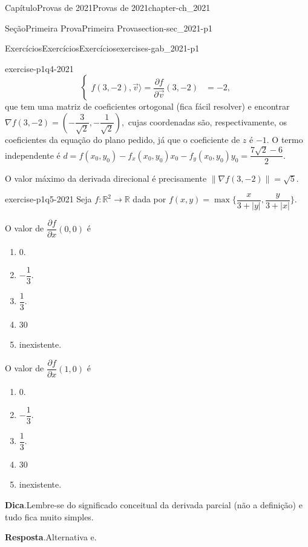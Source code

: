 \documentclass[oneside,10pt,]{book}
\newcommand{\blocktitlefont}{\relax}
\numberwithin{equation}{section}
\newcommand{\R}{\mathbb R}
\begin{document}
\begin{chapterptx}{Capítulo}{Provas de 2021}{}{Provas de 2021}{}{}{chapter-ch_2021}
\begin{sectionptx}{Seção}{Primeira Prova}{}{Primeira Prova}{}{}{section-sec_2021-p1}
\begin{exercises-subsection-numberless}{Exercícios}{Exercícios}{}{Exercícios}{}{}{exercises-gab_2021-p1}
\begin{divisionexercise}{4}{}{}{exercise-p1q4-2021}
\begin{equation*}
\begin{cases}
f(3,-2),\vec{v}\big\rangle= \dfrac{\partial f}{\partial
\vec{v}}(3,-2)&=-2, \end{cases}
\end{equation*}
que tem uma matriz de coeficientes ortogonal (fica fácil resolver) e encontrar \(\nabla
f(3,-2)=\left(-\dfrac{3}{\sqrt{2}},-\dfrac{1}{\sqrt{2}}\right),\) cujas coordenadas são, respectivamente, os coeficientes da equação do plano pedido, já que o coeficiente de \(z\) é \(-1\). O termo independente é \(d=f(x_0,y_0)-f_x(x_0,y_0)x_0-f_y(x_0,y_0)y_0=\dfrac{7\sqrt{2}-6}{2}\).%
\par
O valor máximo da derivada direcional é precisamente \(\|\nabla f(3,-2)\|=\sqrt{5}\).%
\end{divisionexercise}%
\begin{divisionexercise}{5}{}{}{exercise-p1q5-2021}%
Seja \(f\colon \R^2\to\R\) dada por \(f(x,y)=\max\Big\{\dfrac{x}{3+|y|},\dfrac{y}{3+|x|}\Big\}\).%
\par
O valor de \(\dfrac{\partial f}{\partial x}(0,0)\) é%
\begin{multicols}{5}
\begin{enumerate}[label=\alph*.]
\item{}\(0\).%
\item{}\(-\dfrac{1}{3}\).%
\item{}\(\dfrac{1}{3}\).%
\item{}3\(0\)%
\item{}inexistente.%
\end{enumerate}
\end{multicols}
%
\par
O valor de \(\dfrac{\partial f}{\partial x}(1,0)\) é%
\begin{multicols}{5}
\begin{enumerate}[label=\alph*.]
\item{}\(0\).%
\item{}\(-\dfrac{1}{3}\).%
\item{}\(\dfrac{1}{3}\).%
\item{}3\(0\)%
\item{}inexistente.%
\end{enumerate}
\end{multicols}
%
\par\smallskip%
\noindent\textbf{\blocktitlefont Dica}.\hypertarget{hint-p1q5-2021-b}{}\quad{}Lembre-se do significado conceitual da derivada parcial (não a definição) e tudo fica muito simples.%
\par\smallskip%
\noindent\textbf{\blocktitlefont Resposta}.\hypertarget{answer-p1q5-2021-c}{}\quad{}Alternativa e.%

\end{divisionexercise}
\end{exercises-subsection-numberless}
\end{sectionptx}
\end{chapterptx}
\end{document}
